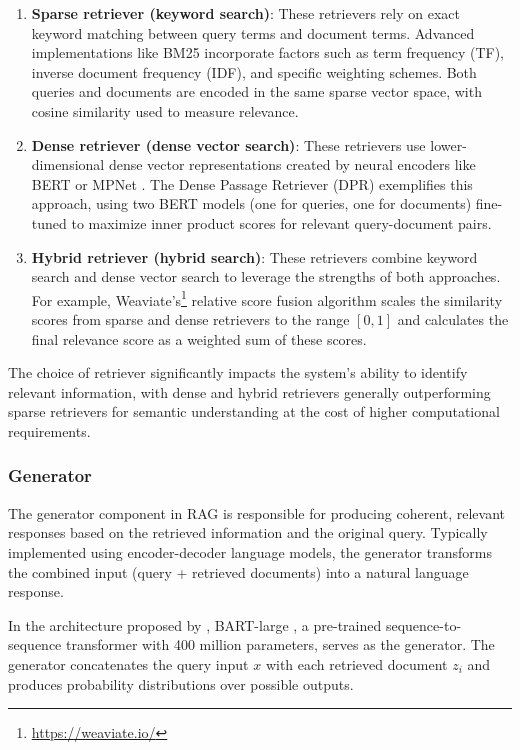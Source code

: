 \begin{enumerate}
    \item \textbf{Sparse retriever (keyword search)}: These retrievers rely on exact keyword matching between query terms and document terms. Advanced implementations like BM25 \citep{robertsonbm25} incorporate factors such as term frequency (TF), inverse document frequency (IDF), and specific weighting schemes. Both queries and documents are encoded in the same sparse vector space, with cosine similarity used to measure relevance.
    
    \item \textbf{Dense retriever (dense vector search)}: These retrievers use lower-dimensional dense vector representations created by neural encoders like BERT \citep{devlin2019bertpretrainingdeepbidirectional} or MPNet \citep{mpnetsong}. The Dense Passage Retriever (DPR) \citep{karpukhin2020densepassageretrievalopendomain} exemplifies this approach, using two BERT models (one for queries, one for documents) fine-tuned to maximize inner product scores for relevant query-document pairs.
    
    \item \textbf{Hybrid retriever (hybrid search)}: These retrievers combine keyword search and dense vector search to leverage the strengths of both approaches. For example, Weaviate's\footnote{\url{https://weaviate.io/}} relative score fusion algorithm scales the similarity scores from sparse and dense retrievers to the range $[0, 1]$ and calculates the final relevance score as a weighted sum of these scores.
\end{enumerate}

The choice of retriever significantly impacts the system's ability to identify relevant information, with dense and hybrid retrievers generally outperforming sparse retrievers for semantic understanding at the cost of higher computational requirements.

\subsubsection{Generator}
The generator component in RAG is responsible for producing coherent, relevant responses based on the retrieved information and the original query. Typically implemented using encoder-decoder language models, the generator transforms the combined input (query + retrieved documents) into a natural language response.

In the architecture proposed by \cite{lewis2021retrievalaugmentedgenerationknowledgeintensivenlp}, BART-large \citep{lewis2019bartdenoisingsequencetosequencepretraining}, a pre-trained sequence-to-sequence transformer with 400 million parameters, serves as the generator. The generator concatenates the query input $x$ with each retrieved document $z_i$ and produces probability distributions over possible outputs.


